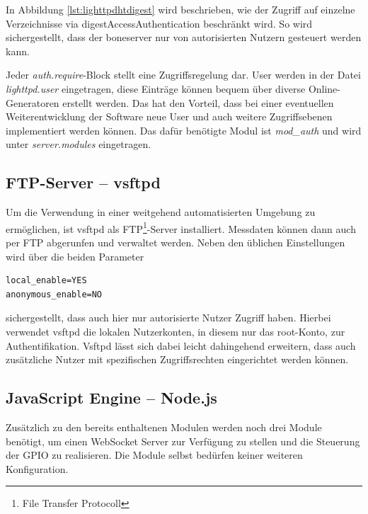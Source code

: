 In Abbildung \ref{lst:lighttpdhtdigest} wird beschrieben, wie der Zugriff auf einzelne Verzeichnisse via \gls{digestAccessAuthentication} beschränkt wird. So wird sichergestellt, dass der boneserver nur von autorisierten Nutzern gesteuert werden kann.

Jeder \textit{auth.require}-Block stellt eine Zugriffsregelung dar. User werden in der Datei \textit{lighttpd.user} eingetragen, diese Einträge können bequem über diverse Online-Generatoren erstellt werden. Das hat den Vorteil, dass bei einer eventuellen Weiterentwicklung der Software neue User und auch weitere Zugriffsebenen implementiert werden können. Das dafür benötigte Modul ist \textit{mod\_auth} und wird unter \textit{server.modules} eingetragen.


\subsection{FTP-Server -- vsftpd}
\label{subsec:vsftpd}
Um die Verwendung in einer weitgehend automatisierten Umgebung zu ermöglichen, ist vsftpd als FTP\footnote{File Transfer Protocoll}-Server installiert. Messdaten können dann auch per FTP abgerunfen und verwaltet werden. Neben den üblichen Einstellungen wird über die beiden Parameter

\begin{lstlisting}
local_enable=YES
anonymous_enable=NO
\end{lstlisting}
sichergestellt, dass auch hier nur autorisierte Nutzer Zugriff haben. Hierbei verwendet vsftpd die lokalen Nutzerkonten, in diesem nur das root-Konto, zur Authentifikation. Vsftpd lässt sich dabei leicht dahingehend erweitern, dass auch zusätzliche Nutzer mit spezifischen Zugriffsrechten eingerichtet werden können.


\subsection{JavaScript Engine -- Node.js}

Zusätzlich zu den bereits enthaltenen Modulen werden noch drei Module benötigt, um einen WebSocket Server zur Verfügung zu stellen und die Steuerung der GPIO zu realisieren. Die Module selbst bedürfen keiner weiteren Konfiguration.

